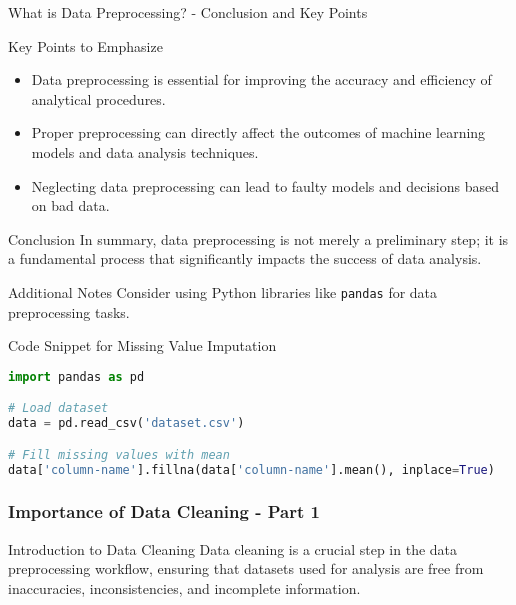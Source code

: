 \documentclass[aspectratio=169]{beamer}
\begin{document}
\begin{frame}[fragile]{What is Data Preprocessing? - Conclusion and Key Points}
    \begin{block}{Key Points to Emphasize}
        \begin{itemize}
            \item Data preprocessing is essential for improving the accuracy and efficiency of analytical procedures.
            \item Proper preprocessing can directly affect the outcomes of machine learning models and data analysis techniques.
            \item Neglecting data preprocessing can lead to faulty models and decisions based on bad data.
        \end{itemize}
    \end{block}
    
    \begin{block}{Conclusion}
        In summary, data preprocessing is not merely a preliminary step; it is a fundamental process that significantly impacts the success of data analysis.
    \end{block}
    
    \begin{block}{Additional Notes}
        Consider using Python libraries like \texttt{pandas} for data preprocessing tasks. 
    \end{block}
\end{frame}

\begin{frame}[fragile]{Code Snippet for Missing Value Imputation}
    \begin{lstlisting}[language=Python]
import pandas as pd

# Load dataset
data = pd.read_csv('dataset.csv')

# Fill missing values with mean
data['column-name'].fillna(data['column-name'].mean(), inplace=True)
    \end{lstlisting}
\end{frame}

\begin{frame}[fragile]
    \frametitle{Importance of Data Cleaning - Part 1}
    \begin{block}{Introduction to Data Cleaning}
        Data cleaning is a crucial step in the data preprocessing workflow, ensuring that datasets used for analysis are free from inaccuracies, inconsistencies, and incomplete information.
    \end{block}
\end{frame}
\end{document}
